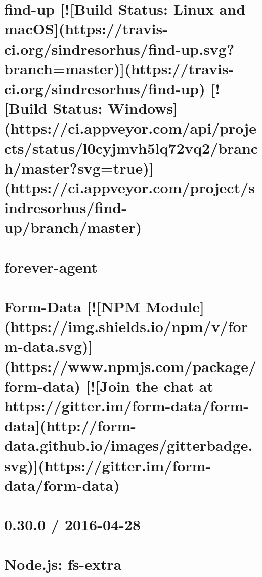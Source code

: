 \documentclass[twoside]{book}
\newcommand{\+}{\discretionary{\mbox{\scriptsize$\hookleftarrow$}}{}{}}
\begin{document}
\chapter{find-\/up \mbox{[}!\mbox{[}Build Status\+: Linux and mac\+OS\mbox{]}(https\+://travis-\/ci.org/sindresorhus/find-\/up.svg?branch=master)\mbox{]}(https\+://travis-\/ci.org/sindresorhus/find-\/up) \mbox{[}!\mbox{[}Build Status\+: Windows\mbox{]}(https\+://ci.appveyor.\+com/api/projects/status/l0cyjmvh5lq72vq2/branch/master?svg=true)\mbox{]}(https\+://ci.appveyor.\+com/project/sindresorhus/find-\/up/branch/master)}
\label{md_dsmacc_examples_DRmerge_node_modules_find-up_readme}

\chapter{forever-\/agent}
\label{md_dsmacc_examples_DRmerge_node_modules_forever-agent_README}

\chapter{Form-\/\+Data \mbox{[}!\mbox{[}N\+PM Module\mbox{]}(https\+://img.shields.\+io/npm/v/form-\/data.svg)\mbox{]}(https\+://www.npmjs.\+com/package/form-\/data) \mbox{[}!\mbox{[}Join the chat at https\+://gitter.im/form-\/data/form-\/data\mbox{]}(http\+://form-\/data.github.\+io/images/gitterbadge.svg)\mbox{]}(https\+://gitter.im/form-\/data/form-\/data)}
\label{md_dsmacc_examples_DRmerge_node_modules_form-data_README}

\chapter{0.30.0 / 2016-\/04-\/28}
\label{md_dsmacc_examples_DRmerge_node_modules_fs-extra_CHANGELOG}

\chapter{Node.\+js\+: fs-\/extra}
\label{md_dsmacc_examples_DRmerge_node_modules_fs-extra_README}

\end{document}
